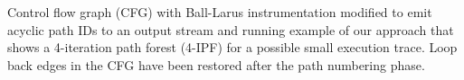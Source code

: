 \label{fig:kblpp-example} Control flow graph (CFG) with Ball-Larus instrumentation modified to emit acyclic path IDs to an output stream and running example of our approach that shows a 4-iteration path forest (4-IPF) for a possible small execution trace. Loop back edges in the CFG have been restored after the path numbering phase.
